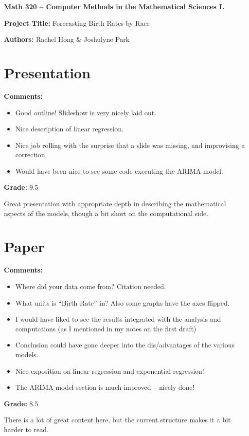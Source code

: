 \documentclass[12pt]{article}
\begin{document}
{\bf \large Math 320 -- Computer Methods in the Mathematical Sciences I.}\\

\vspace{3mm}

{\bf \large Project Title:} Forecasting Birth Rates by Race\\
\vspace{2mm}

{\bf \large Authors:} Rachel Hong \& Joshulyne Park\\

\vspace{3mm}

\section{Presentation}
{\bf \large Comments:}
\begin{itemize}
\item Good outline! Slideshow is very nicely laid out.
\item Nice description of linear regression.
\item Nice job rolling with the surprise that a slide was missing, and improvising a correction.
\item Would have been nice to see some code executing the ARIMA model.
\end{itemize}

{\bf \large Grade:} 9.5

Great presentation with appropriate depth in describing the mathematical
aspects of the models, though a bit short on the computational side.



\section{Paper}

{\bf \large Comments:}
\begin{itemize}
\item Where did your data come from? Citation needed.
\item What units is ``Birth Rate'' in? Also some graphs have the axes flipped.
\item I would have liked to see the results integrated with the analysis and computations (as I mentioned in my notes on the first draft)
\item Conclusion could have gone deeper into the dis/advantages of
the various models.
\item Nice exposition on linear regression and exponential regression!
\item The ARIMA model section is much improved -- nicely done!
\end{itemize}


{\bf \large Grade:} 8.5

There is a lot of great content here, but the current structure makes it
a bit harder to read. 
\end{document}
